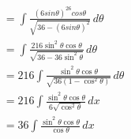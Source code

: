 \documentclass[preview]{standalone}
\begin{document}
\begin{align*}
&=\int \frac{(6sin\theta)^26cos\theta}{\sqrt{36-(6sin\theta)^2}} \, d\theta \\ &=\int \frac{216\sin^2\theta\cos\theta}{\sqrt{36-36\sin^2\theta}} \, d\theta \\&=216 \int \frac{\sin^2\theta\cos\theta}{\sqrt{36(1-\cos^2\theta)}} \, d\theta \\&=216 \int \frac{\sin^2\theta\cos\theta}{6\sqrt{\cos^2\theta}} \, dx \\&=36 \int \frac{\sin^2\theta\cos\theta}{\cos\theta} \, dx
\end{align*}
\end{document}
